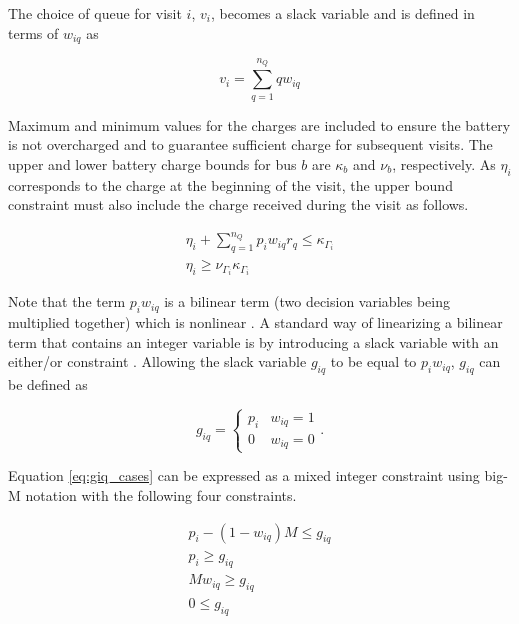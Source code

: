 \documentclass[utf8]{FrontiersinHarvard}
\let\cite\citep                                                                 %
\begin{document}
The choice of queue for visit $i$, $v_i$, becomes a slack variable and is defined in terms of $w_{iq}$ as

\begin{equation}
    v_i = \sum_{q=1}^{n_Q} qw_{iq}
\end{equation}

Maximum and minimum values for the charges are included to ensure the battery is not overcharged and to guarantee
sufficient charge for subsequent visits. The upper and lower battery charge bounds for bus $b$ are $\kappa_b$ and $\nu_b$,
respectively. As $\eta_i$ corresponds to the charge at the beginning of the visit, the upper bound constraint must also
include the charge received during the visit as follows.

\begin{subequations}
    \label{subeq:pre_min_max}
\begin{align}
    \eta_i + \sum_{q=1}^{n_Q} p_i w_{iq} r_q \leq \kappa_{\Gamma_i}                 \\
    \eta_i \geq \nu_{\Gamma_i} \kappa_{\Gamma_i}
\end{align}
\end{subequations}

Note that the term $p_i w_{iq}$ is a bilinear term (two decision variables being multiplied together) which is nonlinear
\cite{Rodriguez2013}. A standard way of linearizing a bilinear term that contains an integer variable is by introducing
a slack variable with an either/or constraint \cite{Chen2010,Rodriguez2013}. Allowing the slack variable $g_{iq}$ to be
equal to $p_i w_{iq}$, $g_{iq}$ can be defined as

\begin{equation}
    \label{eq:giq_cases}
    g_{iq} =
    \begin{cases}
        p_i & w_{iq} = 1 \\
        0 & w_{iq} = 0
    \end{cases}.
\end{equation}

Equation \eqref{eq:giq_cases} can be expressed as a mixed integer constraint using big-M notation with the following
four constraints.

\begin{subequations}
    \label{eq:slack_gain}
\begin{align}
    p_i - (1 - w_{iq})M \leq g_{iq}  \label{subeq:repgpgret} \\
    p_i \geq g_{iq}                 \label{subeq:repgples} \\
    Mw_{iq} \geq g_{iq}              \label{subeq:repgwgret} \\
    0 \leq g_{iq}                   \label{subeq:repgwles}
\end{align}
\end{subequations}
\end{document}
